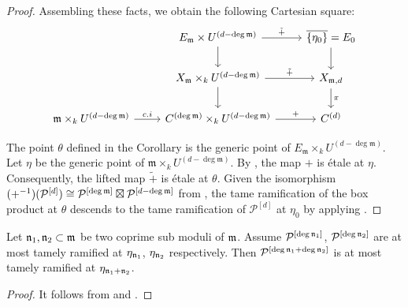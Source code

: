 \begin{proof}
Assembling these facts, we obtain the following Cartesian square:
\[
\begin{tikzcd}
&  E_{\mdls}\times U^{(d - \deg \mdls)}  \arrow[r, "\tilde{+}"] \arrow[d] & \overline{\{\eta_0 \}} =  E_0 \arrow[d] \\
& X_{\mdls} \times_k U^{(d - \deg \mdls)} \arrow[d] \arrow[r, "\tilde{+}"] & X_{\mdls, d} \arrow[d, "\pi"] \\
\mdls \times_k U^{(d-\deg \mdls)} \arrow[r, "c.i"] & C^{(\deg \mdls)} \times_k U^{(d-\deg \mdls)} \arrow[r, "+"]  & C^{(d)}
\end{tikzcd}
\]

The point $\theta$ defined in the Corollary is the generic point of $E_{\mathfrak{m}} \times_k U^{(d-\deg \mathfrak{m})}$.
 Let $\eta$ be the generic point of $\mathfrak{m} \times_k U^{(d-\deg \mathfrak{m})}$.
 By , the map $+$ is étale at $\eta$.
Consequently, the lifted map $\tilde{+}$ is étale at $\theta$.
Given the isomorphism $(+^{-1})(\mathcal{P}^{[d]}) \cong \mathcal{P}^{[\deg \mathfrak{m}]} \boxtimes \mathcal{P}^{[d - \deg \mathfrak{m}]}$ from ,
the tame ramification of the box product at $\theta$ descends to the tame ramification of $\mathcal{P}^{[d]}$ at $\eta_0$ by applying .

\end{proof}

\begin{lemma}\label{lemma:moduli_reduction}
     Let $\mathfrak{n}_1, \mathfrak{n}_2 \subset \mathfrak{m}$ be two coprime sub moduli of $\mathfrak{m}$.
     Assume $\mathcal{P}^{[\deg \mathfrak{n}_1]}$, $\mathcal{P}^{[\deg \mathfrak{n}_2]}$ are at most tamely ramified at $\eta_{\mathfrak{n}_1}$, $\eta_{\mathfrak{n}_2}$ respectively.
     Then $\mathcal{P}^{[\deg \mathfrak{n}_1 + \deg \mathfrak{n}_2]}$ is at most tamely ramified at $\eta_{\mathfrak{n}_1 + \mathfrak{n}_2}$.
\end{lemma}

\begin{proof}
     It follows from  and .
\end{proof}


